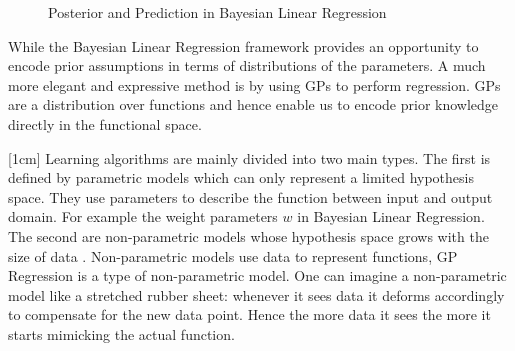 \begin{figure}[!ht]
  \centering
{}\quad
{}\quad
       \caption{Posterior and Prediction in Bayesian Linear Regression}
       \label{figPriorAndPosterior}
\end{figure}

While the Bayesian Linear Regression framework provides an opportunity to encode prior assumptions in terms of distributions of the parameters. A much more elegant and expressive method is by using GPs to perform regression. GPs are a distribution over functions and hence enable us to encode prior knowledge directly in the functional space. 

[1cm]
Learning algorithms are mainly divided into two main types. The first is defined by parametric models which can only represent a limited hypothesis space. They use parameters to describe the function between input and output domain. For example the weight parameters $w$ in Bayesian Linear Regression. The second are non-parametric models whose hypothesis space grows with the size of data \cite{ghahramani2013bayesian}. Non-parametric models use data to represent functions, GP Regression is a type of non-parametric model. One can imagine a non-parametric model like a stretched rubber sheet: whenever it sees data it deforms accordingly to compensate for the new data point. Hence the more data it sees the more it starts mimicking the actual function. 

